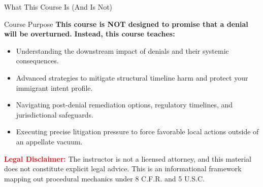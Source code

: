 \documentclass[11pt]{beamer}
\begin{document}
	
	\begin{frame}{What This Course Is (And Is Not)}
		\scriptsize
		\begin{block}{Course Purpose}
			\textbf{This course is NOT designed to promise that a denial will be overturned.}
			\vspace{0.1cm}
			\textbf{Instead, this course teaches:}
			\begin{itemize}
				\item Understanding the downstream impact of denials and their systemic consequences.
				\item Advanced strategies to mitigate structural timeline harm and protect your immigrant intent profile.
				\item Navigating post-denial remediation options, regulatory timelines, and jurisdictional safeguards.
				\item Executing precise litigation pressure to force favorable local actions outside of an appellate vacuum.
			\end{itemize}
			\textcolor{red}{\textbf{Legal Disclaimer:}} The instructor is not a licensed attorney, and this material does not constitute explicit legal advice. This is an informational framework mapping out procedural mechanics under 8 C.F.R. and 5 U.S.C.
		\end{block}
	\end{frame}
	
	
\end{document}

